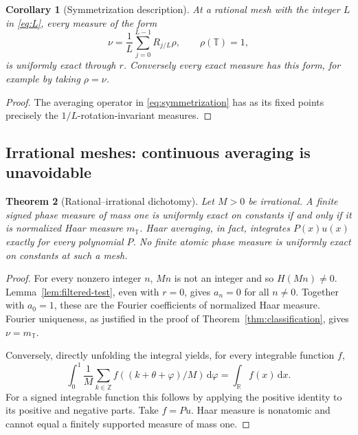 \documentclass[11pt,a4paper]{article}
\numberwithin{equation}{section}
\newtheorem{theorem}{Theorem}[section]
\newtheorem{corollary}[theorem]{Corollary}
\theoremstyle{definition}
\theoremstyle{remark}
\newcommand{\R}{\mathbb R}\newcommand{\Z}{\mathbb Z}\newcommand{\N}{\mathbb N}
\newcommand{\T}{\mathbb T}\newcommand{\C}{\mathbb C}
\newcommand{\dd}{\,\mathrm d}\newcommand{\ii}{\mathrm i}
\begin{document}
\begin{corollary}[Symmetrization description]
\label{cor:symmetrization}
At a rational mesh with the integer $L$ in \eqref{eq:L}, every measure
of the form
\begin{equation}
 \nu=\frac1L\sum_{j=0}^{L-1}R_{j/L}\rho,
 \qquad \rho(\T)=1,
 \label{eq:symmetrization}
\end{equation}
is uniformly exact through $r$. Conversely every exact measure has this
form, for example by taking $\rho=\nu$.
\end{corollary}
\begin{proof}
The averaging operator in \eqref{eq:symmetrization} has as its fixed
points precisely the $1/L$-rotation-invariant measures.
\end{proof}

\subsection{Irrational meshes: continuous averaging is unavoidable}

\begin{theorem}[Rational--irrational dichotomy]
\label{thm:irrational}
Let $M>0$ be irrational. A finite signed phase measure of mass one is
uniformly exact on constants if and only if it is normalized Haar measure
$m_\T$. Haar averaging, in fact, integrates $P(x)u(x)$ exactly for every
polynomial $P$. No finite atomic phase measure is uniformly exact on
constants at such a mesh.
\end{theorem}
\begin{proof}
For every nonzero integer $n$, $Mn$ is not an integer and so $H(Mn)\ne0$.
Lemma~\ref{lem:filtered-test}, even with $r=0$, gives $a_n=0$ for all
$n\ne0$. Together with $a_0=1$, these are the Fourier coefficients of
normalized Haar measure. Fourier uniqueness, as justified in the proof
of Theorem~\ref{thm:classification}, gives $\nu=m_\T$.

Conversely, directly unfolding the integral yields, for every integrable
function $f$,
\begin{equation}
 \int_0^1\frac1M\sum_{k\in\Z}
 f((k+\theta+\varphi)/M)\dd\varphi=\int_\R f(x)\dd x.
 \label{eq:haar-unfold}
\end{equation}
For a signed integrable function this follows by applying the positive
identity to its positive and negative parts. Take $f=Pu$. Haar measure
is nonatomic and cannot equal a finitely supported measure of mass one.
\end{proof}
\end{document}
